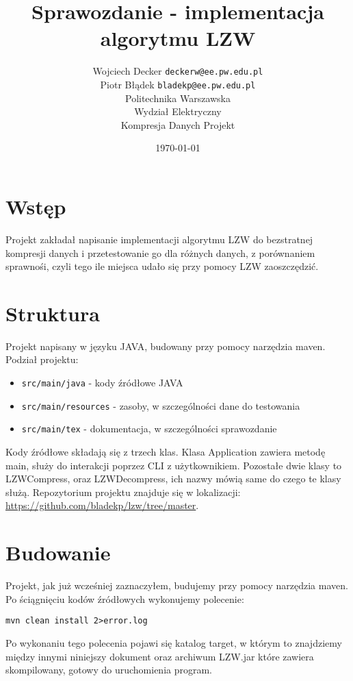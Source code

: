 \documentclass{article}
\begin{document}
\title{Sprawozdanie - implementacja algorytmu LZW} 
\author{
        Wojciech Decker \texttt{deckerw@ee.pw.edu.pl} \\
        Piotr Błądek \texttt{bladekp@ee.pw.edu.pl} \\
        Politechnika Warszawska \\
        Wydział Elektryczny \\
        Kompresja Danych Projekt
       }
\date{\today} 
\maketitle

\section{Wstęp}

Projekt zakładał napisanie implementacji algorytmu LZW do bezstratnej kompresji danych
i przetestowanie go dla różnych danych, z porównaniem sprawnośi, czyli tego ile
miejsca udało się przy pomocy LZW zaoszczędzić.

\section{Struktura}

Projekt napisany w języku JAVA, budowany przy pomocy narzędzia maven. Podział projektu:
\begin{itemize}
    \item \texttt{src/main/java} - kody źródłowe JAVA
    \item \texttt{src/main/resources} - zasoby, w szczególności dane do testowania
    \item \texttt{src/main/tex} - dokumentacja, w szczególności sprawozdanie
\end{itemize}
Kody źródłowe składają się z trzech klas. Klasa Application zawiera metodę main,
służy do interakcji poprzez CLI z użytkownikiem. Pozostałe dwie klasy to LZWCompress,
oraz LZWDecompress, ich nazwy mówią same do czego te klasy służą. Repozytorium 
projektu znajduje się w lokalizacji: \url{https://github.com/bladekp/lzw/tree/master}.

\section{Budowanie}

Projekt, jak już wcześniej zaznaczyłem, budujemy przy pomocy narzędzia maven. Po
ściągnięciu kodów źródłowych wykonujemy polecenie:
\begin{lstlisting}
mvn clean install 2>error.log
\end{lstlisting}
Po wykonaniu tego polecenia pojawi się katalog target, w którym to znajdziemy między innymi niniejszy 
dokument oraz archiwum LZW.jar które zawiera skompilowany, gotowy do uruchomienia program.
\end{document}
